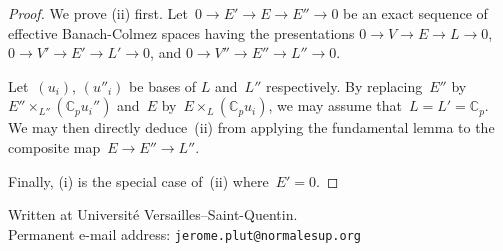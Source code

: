 \documentclass{article}
\theoremstyle{definition}
\def\Cp{{ℂ_p}}
\begin{document}
\begin{proof}
We prove (ii) first.
Let~$0 → E' → E → E'' → 0$ be an exact sequence of effective
Banach-Colmez spaces having the presentations
$0 → V → E → L → 0$, $0 → V' → E' → L' → 0$, and $0 → V'' → E'' → L'' →
0$.

Let~$(u_i)$, $(u''_i)$ be bases of $L$ and~$L''$ respectively.
By replacing~$E''$ by~$E'' ×_{L''} (\Cp u_i'')$ and~$E$ by~$E ×_{L} (\Cp
u_i)$, we may assume that~$L = L' = \Cp$. We may then directly
deduce~(ii) from applying the fundamental lemma to the composite map~$E →
E'' → L''$.

Finally, (i) is the special case of~(ii) where~$E' = 0$.
\end{proof}%



\noindent
Written at Université Versailles--Saint-Quentin.\\\noindent
Permanent e-mail address: \texttt{jerome.plut@normalesup.org}
\end{document}
